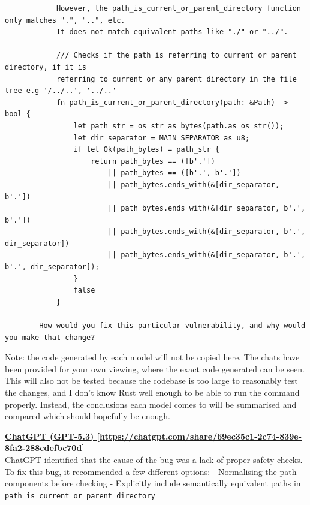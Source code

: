 \documentclass[titlepage]{article}
\begin{document}
\begin{verbatim}
            However, the path_is_current_or_parent_directory function only matches ".", "..", etc. 
            It does not match equivalent paths like "./" or "../".
                    
            /// Checks if the path is referring to current or parent directory, if it is 
            referring to current or any parent directory in the file tree e.g '/../..', '../..'
            fn path_is_current_or_parent_directory(path: &Path) -> bool {
                let path_str = os_str_as_bytes(path.as_os_str());
                let dir_separator = MAIN_SEPARATOR as u8;
                if let Ok(path_bytes) = path_str {
                    return path_bytes == ([b'.'])
                        || path_bytes == ([b'.', b'.'])
                        || path_bytes.ends_with(&[dir_separator, b'.'])
                        || path_bytes.ends_with(&[dir_separator, b'.', b'.'])
                        || path_bytes.ends_with(&[dir_separator, b'.', dir_separator])
                        || path_bytes.ends_with(&[dir_separator, b'.', b'.', dir_separator]);
                }
                false
            }
        
        How would you fix this particular vulnerability, and why would you make that change?
        \end{verbatim}

        Note: the code generated by each model will not be copied here. The
        chats have been provided for your own viewing, where the exact code
        generated can be seen. This will also not be tested because the codebase
        is too large to reasonably test the changes, and I don't know Rust well
        enough to be able to run the command properly. Instead, the conclusions
        each model comes to will be summarised and compared which should
        hopefully be enough.

        \bigskip

        \textbf{\href{https://chatgpt.com/share/69ec35c1-2c74-839e-8fa2-288cdefbc70d}{ChatGPT (GPT-5.3) [https://chatgpt.com/share/69ec35c1-2c74-839e-8fa2-288cdefbc70d]}} \\
        ChatGPT identified that the cause of the bug was a lack of proper safety
        checks. To fix this bug, it recommended a few different options: -
        Normalising the path components before checking - Explicitly include
        semantically equivalent paths in
        \texttt{path\_is\_current\_or\_parent\_directory}

        \vspace{0.5em}
\end{document}
